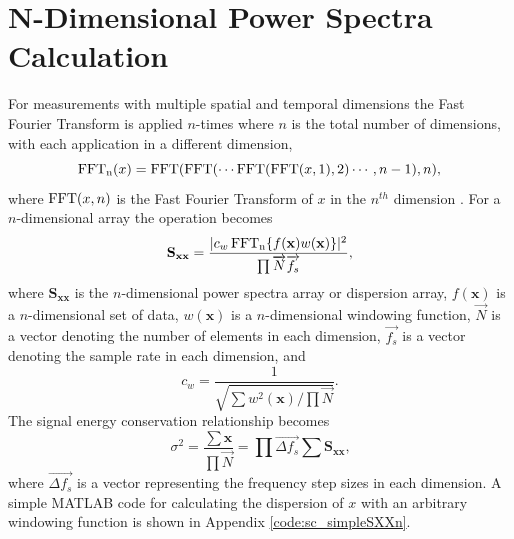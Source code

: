\section{N-Dimensional Power Spectra Calculation}
For measurements with multiple spatial and temporal dimensions the Fast Fourier Transform is applied $n$-times where $n$ is the total number of dimensions, with each application in a different dimension,
\begin{equation}
 \operatorname{FFT_n}(x) = \operatorname{FFT}(\operatorname{FFT}(\cdots\operatorname{FFT}(\operatorname{FFT}(x,1),2)\cdots,n-1),n) \textrm{,}
 \label{eqn:04_fftn}
\end{equation}
where $\operatorname{FFT}(x,n)$ is the Fast Fourier Transform of $x$ in the $n^{th}$ dimension \cite{An-1991-QKg7heKm}.
For a $n$-dimensional array the operation becomes \cite{McClellan-1982-rGQzuZ7t}
\begin{equation}
 \mathbf{S_{xx}} =\frac{|c_w\operatorname{FFT_n}\{f(\mathbf{x}) w(\mathbf{x})\}|^2}{\prod{\overrightarrow{N}\overrightarrow{f_s}}} \textrm{,}
 \label{eqn:04_sxxn}
\end{equation}
where $\mathbf{S_{xx}}$ is the $n$-dimensional power spectra array or dispersion array, $f(\mathbf{x})$ is a $n$-dimensional set of data, $w(\mathbf{x})$ is a $n$-dimensional windowing function, $\overrightarrow{N}$ is a vector denoting the number of elements in each dimension, $\overrightarrow{f_s}$ is a vector denoting the sample rate in each dimension, and
\begin{equation}
 c_w = \frac{1}{\sqrt{\sum w^2(\mathbf{x})/\prod{\overrightarrow{N}}}} \textrm{.}
 \label{eqn:04_windown}
\end{equation}
The signal energy conservation relationship becomes
\begin{equation}
  \sigma^2=\frac{\sum\mathbf{x}}{\prod{\overrightarrow{N}}} = \prod{\overrightarrow{\Delta f_s}}\sum\mathbf{S_{xx}} \textrm{,}
  \label{eqn:04_fftn_energy_conservation}
\end{equation}
where $\overrightarrow{\Delta f_s}$ is a vector representing the frequency step sizes in each dimension.
A simple MATLAB code for calculating the dispersion of $x$ with an arbitrary windowing function is shown in Appendix \ref{code:sc_simpleSXXn}.

